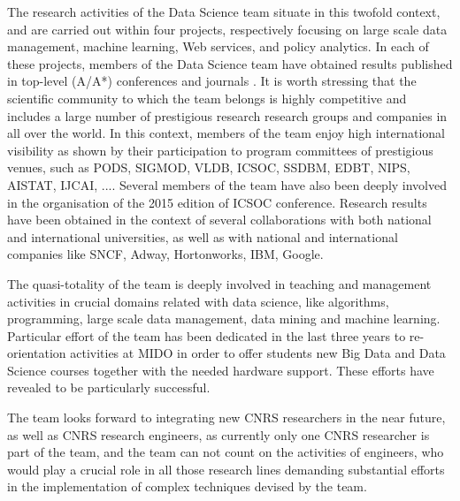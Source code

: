 The research activities of the Data Science team situate in this twofold context, and are carried out within four projects, respectively  focusing on large scale data management, machine learning, Web services, and policy analytics. In each of these projects,  members of the Data Science team have obtained results published in top-level (A/A*) conferences  and  journals \cite{Colazzo2014RDF-629026,Camacho-Rodriguez2014PAXQuery:-1007886,DBLP:journals/tkde/Camacho-Rodriguez15,DBLP:conf/cikm/Camacho-Rodriguez16,Abu-Khzam2015On-1017005,Gamez2015SPL-TQSSS:-1298429, DBLP:conf/icsoc/GabrelMM14,GMMM17,DBLP:conf/icsoc/2015,DBLP:conf/icsoc/2014w,Bojarski2017Structured-1259771,AngaritaArocha2016Modeling-1159056,AngaritaArocha2012FaCETa:-619549,AngaritaArocha2015Dynamic-1061562,Mouhoub2014A-1061556,Mouhoub2015LIDSEARCH:-1061527,DBLP:conf/eScience/CarvalhoBM16,DBLP:conf/ssdbm/RiosPFB16,DBLP:conf/ssdbm/BelhajjameB16,DBLP:journals/dpd/BelhajjamePHF15,DBLP:journals/ws/Belhajjame0GGHP15,DBLP:journals/fgcs/GarijoABCGG14,DBLP:journals/tsc/BelhajjameEP14,DBLP:conf/edbt/Belhajjame14,Bacall2013The-904520,Belhajjame2013Incrementally-904545,Missier2013The-1007766}.  It is worth stressing that the scientific community to which the team belongs is highly competitive and includes a large number of  prestigious research research groups and companies in all over the  world. In this context, members of the team  enjoy high international visibility  as shown by their  participation to program committees of prestigious venues, such as PODS, SIGMOD, VLDB, ICSOC, SSDBM, EDBT,  NIPS, AISTAT, IJCAI, .... Several members of the  team have also been deeply involved  in the organisation of the 2015 edition of ICSOC conference. Research results have been obtained in the context of several collaborations with both national and international universities, as well as  with  national and international companies like  SNCF, Adway, Hortonworks, IBM, Google. 

\smallskip
The quasi-totality  of the team is  deeply involved in teaching and management activities in crucial domains related with data science,  like algorithms, programming, large scale data management, data mining and machine learning. Particular effort of the team has been dedicated in the last three years to  re-orientation activities at MIDO in order to offer students new Big Data and Data Science courses together with the needed hardware support.  These efforts have revealed to be particularly successful.

\smallskip
The team looks forward  to integrating  new CNRS researchers in the near future, as well as  CNRS research engineers, as currently only one CNRS researcher is part of the team, and the team can not count on the activities of engineers, who would play a crucial role in all those research lines demanding substantial efforts in the implementation of complex techniques devised by the team. 


